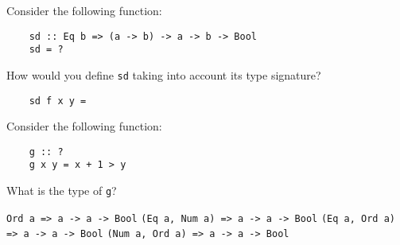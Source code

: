 \documentclass[a4paper,10pt,addpoints]{exam}
\begin{document}
\begin{center}
\end{center}

\vspace{0.1in}


\vspace{0.2in}

\begin{questions}


  \question

  Consider the following function:

  \begin{verbatim}
    sd :: Eq b => (a -> b) -> a -> b -> Bool
    sd = ?
  \end{verbatim}

  How would you define \texttt{sd} taking into account its type
  signature?

  \begin{verbatim}
    sd f x y =
  \end{verbatim}


  \question

  Consider the following function:

  \begin{verbatim}
    g :: ?
    g x y = x + 1 > y
  \end{verbatim}

  What is the type of \texttt{g}?

  \vspace{0.15in}

  \begin{choices}
    \choice \texttt{Ord a => a -> a -> Bool}
    \choice \texttt{(Eq a, Num a) => a -> a -> Bool}
    \choice \texttt{(Eq a, Ord a) => a -> a -> Bool}
    \choice \texttt{(Num a, Ord a) => a -> a -> Bool}
  \end{choices}


  \question


\end{questions}
\end{document}
